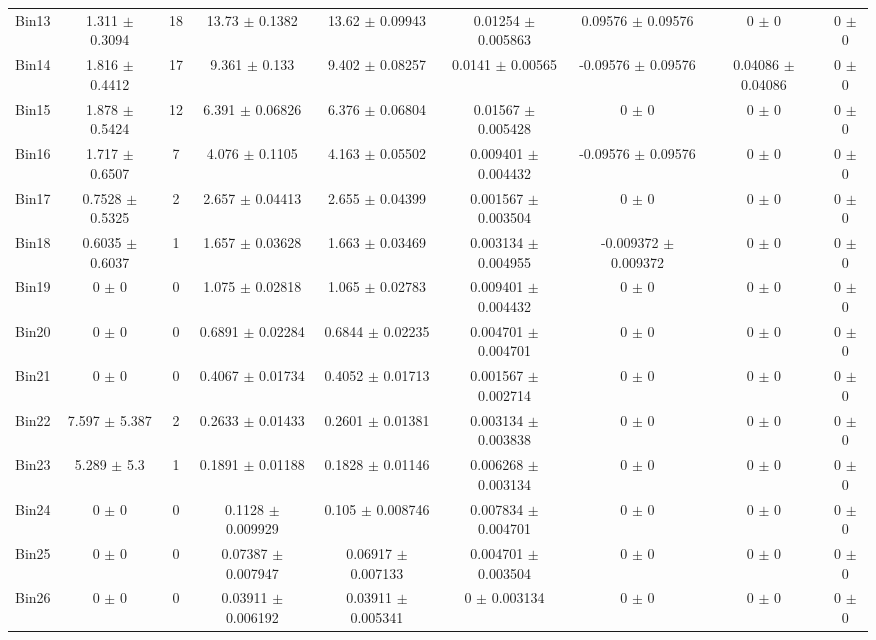 \begin{tabular}{@{\extracolsep{4pt}}lcccccccc@{}}
     Bin13 & 1.311 $\pm$ 0.3094 & 18 & 13.73 $\pm$ 0.1382 & 13.62 $\pm$ 0.09943 & 0.01254 $\pm$ 0.005863 & 0.09576 $\pm$ 0.09576 & 0 $\pm$ 0 & 0 $\pm$ 0 \\ 
     Bin14 & 1.816 $\pm$ 0.4412 & 17 & 9.361 $\pm$ 0.133 & 9.402 $\pm$ 0.08257 & 0.0141 $\pm$ 0.00565 & -0.09576 $\pm$ 0.09576 & 0.04086 $\pm$ 0.04086 & 0 $\pm$ 0 \\ 
     Bin15 & 1.878 $\pm$ 0.5424 & 12 & 6.391 $\pm$ 0.06826 & 6.376 $\pm$ 0.06804 & 0.01567 $\pm$ 0.005428 & 0 $\pm$ 0 & 0 $\pm$ 0 & 0 $\pm$ 0 \\ 
     Bin16 & 1.717 $\pm$ 0.6507 & 7 & 4.076 $\pm$ 0.1105 & 4.163 $\pm$ 0.05502 & 0.009401 $\pm$ 0.004432 & -0.09576 $\pm$ 0.09576 & 0 $\pm$ 0 & 0 $\pm$ 0 \\ 
     Bin17 & 0.7528 $\pm$ 0.5325 & 2 & 2.657 $\pm$ 0.04413 & 2.655 $\pm$ 0.04399 & 0.001567 $\pm$ 0.003504 & 0 $\pm$ 0 & 0 $\pm$ 0 & 0 $\pm$ 0 \\ 
     Bin18 & 0.6035 $\pm$ 0.6037 & 1 & 1.657 $\pm$ 0.03628 & 1.663 $\pm$ 0.03469 & 0.003134 $\pm$ 0.004955 & -0.009372 $\pm$ 0.009372 & 0 $\pm$ 0 & 0 $\pm$ 0 \\ 
     Bin19 & 0 $\pm$ 0 & 0 & 1.075 $\pm$ 0.02818 & 1.065 $\pm$ 0.02783 & 0.009401 $\pm$ 0.004432 & 0 $\pm$ 0 & 0 $\pm$ 0 & 0 $\pm$ 0 \\ 
     Bin20 & 0 $\pm$ 0 & 0 & 0.6891 $\pm$ 0.02284 & 0.6844 $\pm$ 0.02235 & 0.004701 $\pm$ 0.004701 & 0 $\pm$ 0 & 0 $\pm$ 0 & 0 $\pm$ 0 \\ 
     Bin21 & 0 $\pm$ 0 & 0 & 0.4067 $\pm$ 0.01734 & 0.4052 $\pm$ 0.01713 & 0.001567 $\pm$ 0.002714 & 0 $\pm$ 0 & 0 $\pm$ 0 & 0 $\pm$ 0 \\ 
     Bin22 & 7.597 $\pm$ 5.387 & 2 & 0.2633 $\pm$ 0.01433 & 0.2601 $\pm$ 0.01381 & 0.003134 $\pm$ 0.003838 & 0 $\pm$ 0 & 0 $\pm$ 0 & 0 $\pm$ 0 \\ 
     Bin23 & 5.289 $\pm$ 5.3 & 1 & 0.1891 $\pm$ 0.01188 & 0.1828 $\pm$ 0.01146 & 0.006268 $\pm$ 0.003134 & 0 $\pm$ 0 & 0 $\pm$ 0 & 0 $\pm$ 0 \\ 
     Bin24 & 0 $\pm$ 0 & 0 & 0.1128 $\pm$ 0.009929 & 0.105 $\pm$ 0.008746 & 0.007834 $\pm$ 0.004701 & 0 $\pm$ 0 & 0 $\pm$ 0 & 0 $\pm$ 0 \\ 
     Bin25 & 0 $\pm$ 0 & 0 & 0.07387 $\pm$ 0.007947 & 0.06917 $\pm$ 0.007133 & 0.004701 $\pm$ 0.003504 & 0 $\pm$ 0 & 0 $\pm$ 0 & 0 $\pm$ 0 \\ 
     Bin26 & 0 $\pm$ 0 & 0 & 0.03911 $\pm$ 0.006192 & 0.03911 $\pm$ 0.005341 & 0 $\pm$ 0.003134 & 0 $\pm$ 0 & 0 $\pm$ 0 & 0 $\pm$ 0 \\ 

\end{tabular}
